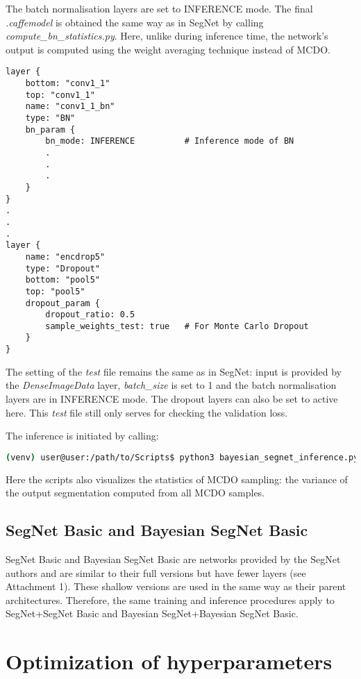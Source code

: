 The batch normalisation layers are set to INFERENCE mode. The final \textit{.caffemodel} is obtained the same way as in SegNet by calling \textit{compute\_bn\_statistics.py}. Here, unlike during inference time, the network's output is computed using the weight averaging technique instead of MCDO.

\begin{lstlisting}[caption={Setting MCDO in \textit{inference.prototxt} \cite{filip_github}},captionpos=b]
layer {
	bottom: "conv1_1"
	top: "conv1_1"
	name: "conv1_1_bn"
	type: "BN"
	bn_param {
		bn_mode: INFERENCE			# Inference mode of BN
		.
		.
		.
	}
}
.
.
.
layer {
	name: "encdrop5"
	type: "Dropout"
	bottom: "pool5"
	top: "pool5"
	dropout_param {
		dropout_ratio: 0.5
		sample_weights_test: true	# For Monte Carlo Dropout
	}
}
\end{lstlisting}

\newpage
The setting of the \textit{test} file remains the same as in SegNet: input is provided by the \textit{DenseImageData} layer, \textit{batch\_size} is set to 1 and the batch normalisation layers are in INFERENCE mode. The dropout layers can also be set to active here. This \textit{test} file still only serves for checking the validation loss.

The inference is initiated by calling:

\begin{lstlisting}[language=bash]
(venv) user@user:/path/to/Scripts$ python3 bayesian_segnet_inference.py /path/to/inference.prototxt /path/to/final_weights.caffemodel /path/to/videofile.avi 
\end{lstlisting}

Here the scripts also visualizes the statistics of MCDO sampling: the variance of the output segmentation computed from all MCDO samples.

\subsection{SegNet Basic and Bayesian SegNet Basic}

SegNet Basic and Bayesian SegNet Basic are networks provided by the SegNet authors and are similar to their full versions but have fewer layers (see Attachment 1). These shallow versions are used in the same way as their parent architectures. Therefore, the same training and inference procedures apply to SegNet+SegNet Basic and Bayesian SegNet+Bayesian SegNet Basic.

\newpage
\section{Optimization of hyperparameters}

